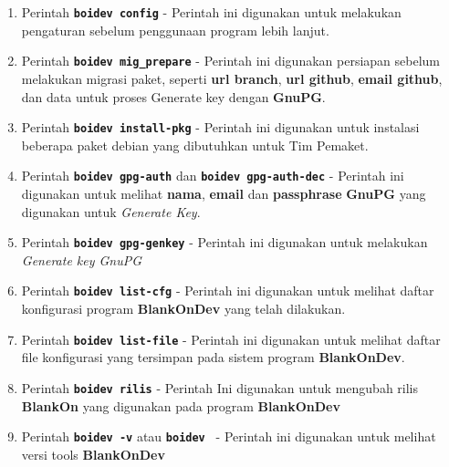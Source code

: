 \begin{enumerate}
	\item Perintah \texttt{\textbf{boidev config}} - Perintah ini digunakan untuk melakukan pengaturan sebelum penggunaan program lebih lanjut.
	
	\item Perintah \texttt{\textbf{boidev mig\_prepare}} - Perintah ini digunakan persiapan sebelum melakukan migrasi paket, seperti \textbf{url branch}, \textbf{url github}, \textbf{email github}, dan data untuk proses Generate key dengan \textbf{GnuPG}.
	
	\item Perintah \texttt{\textbf{boidev install-pkg}} - Perintah ini digunakan untuk instalasi beberapa paket debian yang dibutuhkan untuk Tim Pemaket.
	
	\item Perintah \texttt{\textbf{boidev gpg-auth}} dan \texttt{\textbf{boidev gpg-auth-dec}} - Perintah ini digunakan untuk melihat \textbf{nama}, \textbf{email} dan \textbf{passphrase} \textbf{GnuPG} yang digunakan untuk \textit{Generate Key}.
	
	\item Perintah \texttt{\textbf{boidev gpg-genkey}} - Perintah ini digunakan untuk melakukan \textit{Generate key GnuPG}
	
	\item Perintah \texttt{\textbf{boidev list-cfg}} - Perintah ini digunakan untuk melihat daftar konfigurasi program \textbf{BlankOnDev} yang telah dilakukan.
	
	\item Perintah \texttt{\textbf{boidev list-file}} - Perintah ini digunakan untuk melihat daftar file konfigurasi yang tersimpan pada sistem program \textbf{BlankOnDev}.
	
	\item Perintah \texttt{\textbf{boidev rilis}} - Perintah Ini digunakan untuk mengubah rilis \textbf{BlankOn} yang digunakan pada program \textbf{BlankOnDev}
	
	\item Perintah \texttt{\textbf{boidev -v}} atau \texttt{\textbf{boidev }} - Perintah ini digunakan untuk melihat versi tools \textbf{BlankOnDev}
\end{enumerate}

